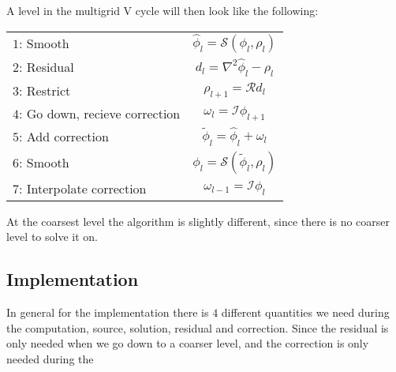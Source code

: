 		A level in the multigrid V cycle will then look like the following:

		\begin{tabular}	{l | c}
			\(1\): Smooth &\( \widehat{\phi}_l = \mathcal{S}(\phi_l, \rho_l)\)
			\\
			\(2\): Residual &	\(d_l = \nabla^2\widehat{\phi}_l - \rho_l\)
			\\
			\(3\): Restrict &\(\rho_{l+1} = \mathcal{R}d_l \) \nonumber
			\\
			\(4\): Go down, recieve correction & \(\omega_l = \mathcal{I} \phi_{l+1}\)
			\\
			\(5\): Add correction	&\(\widetilde{\phi}_l = \widehat{\phi}_l + \omega_l\)
			\\
			\(6\): Smooth	&\(\phi_l = \mathcal{S}(\widetilde{\phi}_l, \rho_l)\)
			\\
			\(7\): Interpolate correction &\( \omega_{l-1} = \mathcal{I} \phi_l\)
		\end{tabular}

		At the coarsest level the algorithm is slightly different, since there is no coarser level to solve it
 		on.

		\subsection{Implementation}
			In general for the implementation there is \(4\) different quantities we need during the computation, source, solution, residual and correction.
			Since the residual is only needed when we go down to a coarser level, and the correction is only needed during the 

